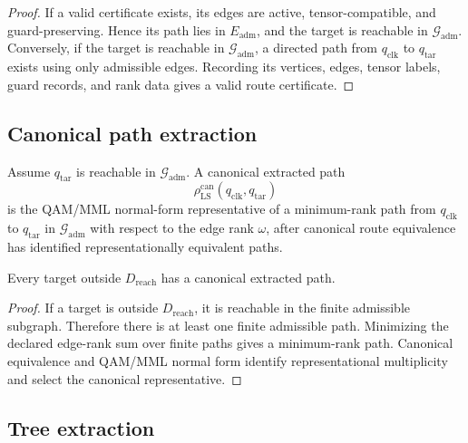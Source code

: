 \begin{proof}
If a valid certificate exists, its edges are active, tensor-compatible, and
guard-preserving. Hence its path lies in \(E_{\mathrm{adm}}\), and the target
is reachable in \(\mathcal G_{\mathrm{adm}}\). Conversely, if the target is
reachable in \(\mathcal G_{\mathrm{adm}}\), a directed path from
\(q_{\mathrm{clk}}\) to \(q_{\mathrm{tar}}\) exists using only admissible
edges. Recording its vertices, edges, tensor labels, guard records, and rank
data gives a valid route certificate.
\end{proof}

\subsection{Canonical path extraction}
\label{subsec:v410r14-canonical-path-extraction}

\begin{definition}
\label{def:v410r14-canonical-extracted-path}
Assume \(q_{\mathrm{tar}}\) is reachable in \(\mathcal G_{\mathrm{adm}}\).
A canonical extracted path
\[
 \rho_{\mathrm{LS}}^{\mathrm{can}}
 (q_{\mathrm{clk}},q_{\mathrm{tar}})
\]
is the QAM/MML normal-form representative of a minimum-rank path from
\(q_{\mathrm{clk}}\) to \(q_{\mathrm{tar}}\) in \(\mathcal G_{\mathrm{adm}}\)
with respect to the edge rank \(\omega\), after canonical route equivalence has
identified representationally equivalent paths.
\end{definition}

\begin{proposition}
\label{prop:v410r14-reachable-targets-have-canonical-extracted-paths}
Every target outside \(D_{\mathrm{reach}}\) has a canonical extracted path.
\end{proposition}

\begin{proof}
If a target is outside \(D_{\mathrm{reach}}\), it is reachable in the finite
admissible subgraph. Therefore there is at least one finite admissible path.
Minimizing the declared edge-rank sum over finite paths gives a minimum-rank
path. Canonical equivalence and QAM/MML normal form identify representational
multiplicity and select the canonical representative.
\end{proof}

\subsection{Tree extraction}
\label{subsec:v410r14-tree-extraction}

